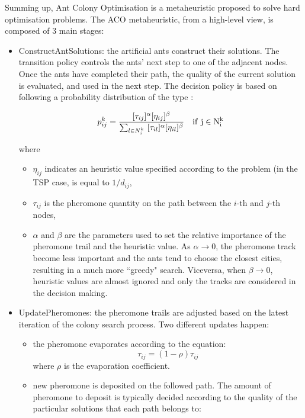 Summing up, Ant Colony Optimisation is a metaheuristic proposed to solve hard optimisation problems. 
The ACO metaheuristic, from a high-level view, is composed of 3 main    stages:    
\begin{itemize}
\item ConstructAntSolutions:
the  artificial  ants  construct  their  solutions.  The transition policy controls  the  ants’  next step to one of the adjacent nodes. Once the ants have completed  their  path,  the quality  of  the current solution is evaluated,  and used in the next step. 
The decision policy is based on following a probability distribution of the type \cite{cinque}:

\begin{equation}
p_{ij}^k=  \frac{[\tau_{ij}]^{\alpha}[\eta_{ij}]^{\beta}}{\sum_{l \in N_i^k} ~  [\tau_{il}]^{\alpha}[\eta_{il}]^{\beta}} ~~~\rm{if} ~j \in N_i^k
\label{eq:prob-aco}
\end{equation}

where 
\begin{itemize}

\item $\eta_{ij}$ indicates an heuristic value specified according to the problem (in the TSP case, is equal to $1/d_{ij}$,
\item  $\tau_{ij}$ is the pheromone quantity on the path between the $i$-th and $j$-th nodes,
\item $\alpha$ and $\beta$ are the parameters used to set the relative importance of the pheromone trail and the heuristic  value.
As $\alpha \rightarrow 0$,  the pheromone  track become  less  important  and  the  ants tend  to choose the closest cities, resulting in a much more ``greedy" search. 
Viceversa, when $\beta \rightarrow 0$, heuristic values are almost ignored and only the tracks are considered in the decision making.  
\end{itemize}
\item UpdatePheromones:  the   pheromone   trails   are   adjusted   based   on   the   latest iteration of  the  colony search process.  
Two different updates happen: 
\begin{itemize}
\item the pheromone  evaporates according to the equation:
\begin{equation}
\tau_{ij}= (1-\rho) \tau_{ij}
\end{equation} 
where $\rho$ is the evaporation coefficient.

\item new pheromone is deposited on the followed path.  The  amount  of  pheromone  to  deposit  is  typically decided  according  to  the  quality  of  the particular  solutions  that  each  path  belongs  to:


\end{itemize}
\end{itemize}
